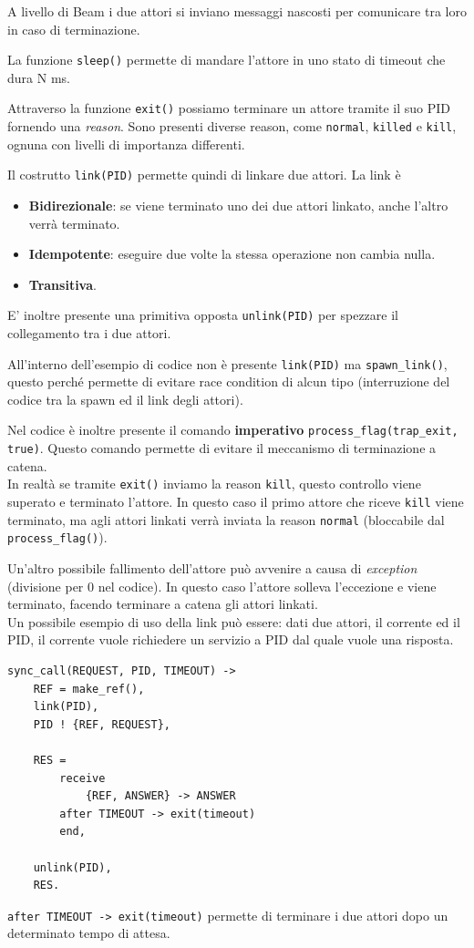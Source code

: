 \documentclass{article}
\begin{document}
A livello di Beam i due attori si inviano messaggi nascosti per comunicare tra loro in caso di terminazione.

La funzione \texttt{sleep()} permette di mandare l'attore in uno stato di timeout che dura N ms.

Attraverso la funzione \texttt{exit()} possiamo terminare un attore tramite il suo PID fornendo una \textit{reason}. Sono presenti diverse reason, come \texttt{normal}, \texttt{killed} e \texttt{kill}, ognuna con livelli di importanza differenti.

Il costrutto \texttt{link(PID)} permette quindi di linkare due attori. La link è
\begin{itemize}
    \item \textbf{Bidirezionale}: se viene terminato uno dei due attori linkato, anche l'altro verrà terminato.
    \item \textbf{Idempotente}: eseguire due volte la stessa operazione non cambia nulla.
    \item \textbf{Transitiva}.
\end{itemize}
E' inoltre presente una primitiva opposta \texttt{unlink(PID)} per spezzare il collegamento tra i due attori.

All'interno dell'esempio di codice non è presente \texttt{link(PID)} ma \texttt{spawn\_link()}, questo perché permette di evitare race condition di alcun tipo (interruzione del codice tra la spawn ed il link degli attori).

Nel codice è inoltre presente il comando \textbf{imperativo} \texttt{process\_flag(trap\_exit, true)}. Questo comando permette di evitare il meccanismo di terminazione a catena.\\
In realtà se tramite \texttt{exit()} inviamo la reason \texttt{kill}, questo controllo viene superato e terminato l'attore. In questo caso il primo attore che riceve \texttt{kill} viene terminato, ma agli attori linkati verrà inviata la reason \texttt{normal} (bloccabile dal \texttt{process\_flag()}).

Un'altro possibile fallimento dell'attore può avvenire a causa di \textit{exception} (divisione per 0 nel codice). In questo caso l'attore solleva l'eccezione e viene terminato, facendo terminare a catena gli attori linkati.
\vspace{14pt}\\
Un possibile esempio di uso della link può essere: dati due attori, il corrente ed il PID, il corrente vuole richiedere un servizio a PID dal quale vuole una risposta.
\begin{tcolorbox}
\begin{verbatim}
sync_call(REQUEST, PID, TIMEOUT) -> 
    REF = make_ref(),
    link(PID),
    PID ! {REF, REQUEST},

    RES = 
        receive 
            {REF, ANSWER} -> ANSWER 
        after TIMEOUT -> exit(timeout) 
        end,

    unlink(PID),
    RES.
\end{verbatim}
\end{tcolorbox}
\texttt{after TIMEOUT -> exit(timeout)} permette di terminare i due attori dopo un determinato tempo di attesa.
\end{document}
